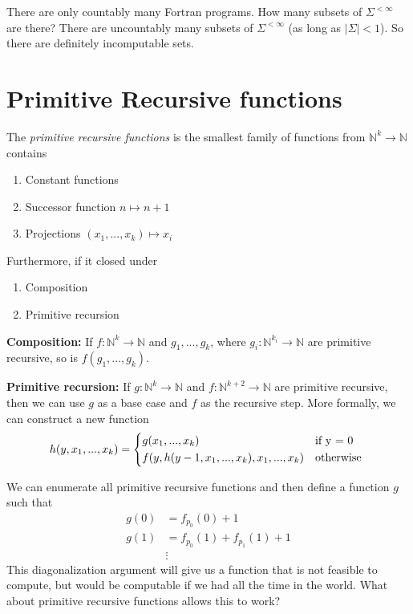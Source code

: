 There are only countably many Fortran programs.
How many subsets of $\Sigma^{<\infty}$ are there?
There are uncountably many subsets of $\Sigma^{<\infty}$ (as long as $|\Sigma|< 1$).
So there are definitely incomputable sets.


\section{Primitive Recursive functions}
The \textit{primitive recursive functions} is the smallest family of functions from $\mathbb{N}^k \to \mathbb{N}$ contains
\begin{enumerate}
    \item Constant functions
    \item Successor function $n \mapsto n + 1$
    \item Projections $(x_1, ..., x_k) \mapsto x_i$
\end{enumerate}
Furthermore, if it closed under
\begin{enumerate}[label=\roman*]
    \item Composition
    \item Primitive recursion
\end{enumerate}

\textbf{Composition:}
If $f : \mathbb{N}^k \to \mathbb{N}$ and $g_1, ..., g_k$, where $g_i : \mathbb{N}^{k_i} \to \mathbb{N}$ are primitive recursive, so is $f(g_1, ..., g_k)$.

\textbf{Primitive recursion:}
If $g : \mathbb{N}^k \to \mathbb{N}$ and $f: \mathbb{N}^{k+2} \to \mathbb{N}$ are primitive recursive, then we can use $g$ as a base case and $f$ as the recursive step.
More formally, we can construct a new function 
$$h(y, x_1, ..., x_k) =
\begin{dcases*}
    g(x_1, ..., x_k) 
    & \text{if} y = 0 \\
    f(y, h(y-1, x_1, ..., x_k), x_1, ..., x_k) 
    & \text{otherwise}
\end{dcases*}
$$

We can enumerate all primitive recursive functions and then define a function $g$ such that
\begin{align*}
    g(0) &= f_{p_0}(0) + 1\\
    g(1) &= f_{p_0}(1) + f_{p_1}(1) + 1 \\
    &\vdots
\end{align*}
This diagonalization argument will give us a function that is not feasible to compute, but would be computable if we had all the time in the world.
What about primitive recursive functions allows this to work?

